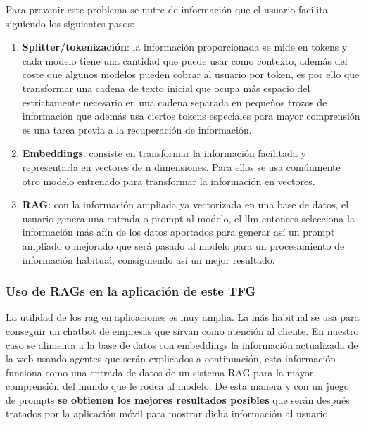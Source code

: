 	Para prevenir este problema se nutre de información que el usuario facilita siguiendo los siguientes pasos:
	\begin{enumerate}
		\item \textbf{Splitter/tokenización}: la información proporcionada se mide en tokens y cada modelo tiene una cantidad que puede usar como contexto, además del coste que algunos modelos pueden cobrar al usuario por token, es por ello que transformar una cadena de texto inicial que ocupa más espacio del estrictamente necesario en una cadena separada en pequeños trozos de información que además usa ciertos tokens especiales para mayor comprensión es una tarea previa a la recuperación de información.
	
		\item \textbf{Embeddings}: consiste en transformar la información facilitada y representarla en vectores de n dimensiones. Para ellos se usa comúnmente otro modelo entrenado para transformar la información en vectores.
		
		
		\item \textbf{RAG}: con la información ampliada ya vectorizada en una base de datos, el usuario genera una entrada o prompt al modelo, el \acrshort{llm} entonces selecciona la información más afín de los datos aportados para generar así un prompt ampliado o mejorado que será pasado al modelo para un procesamiento de información habitual, consiguiendo así un mejor resultado.
		
	\end{enumerate}
	
	\subsubsection{Uso de RAGs en la aplicación de este TFG}
	La utilidad de los \acrfull{rag} en aplicaciones es muy amplia. La más habitual se usa para conseguir un chatbot de empresas que sirvan como atención al cliente. 
	En nuestro caso se alimenta a la base de datos con embeddings la información actualizada de la web usando agentes que serán explicados a continuación, esta información funciona como una entrada de datos de un sistema RAG para la mayor comprensión del mundo que le rodea al modelo. De esta manera y con un juego de prompts \textbf{se obtienen los mejores resultados posibles} que serán después tratados por la aplicación móvil para mostrar dicha información al usuario.
	
